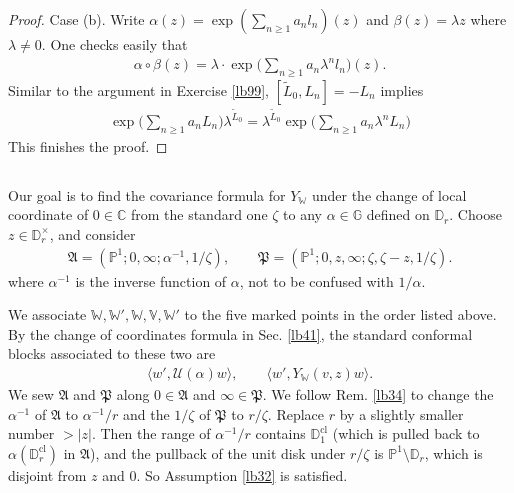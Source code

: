\documentclass[11pt,b5paper,notitlepage]{article}
\theoremstyle{definition}
\theoremstyle{plain}
\newcommand{\fk}{\mathfrak}
\newcommand{\mc}{\mathcal}
\newcommand{\wtd}{\widetilde}
\newcommand{\bk}[1]{\langle {#1}\rangle}
\newcommand{\Vbb}{\mathbb V}
\newcommand{\Wbb}{\mathbb W}
\newcommand{\Gbb}{\mathbb G}
\newcommand{\Cbb}{\mathbb C}
\newcommand{\Pbb}{\mathbb P}
\newcommand{\Dbb}{\mathbb D}
\newcommand{\cl}{\mathrm{cl}}
\numberwithin{equation}{section}
\begin{document}
\begin{proof}
Case (b). Write $\alpha(z)=\exp(\sum_{n\geq 1} a_nl_n)(z)$ and $\beta(z)=\lambda z$ where $\lambda\neq0$. One checks easily that
\begin{align*}
\alpha\circ\beta(z)=\lambda\cdot \exp\Big(\sum_{n\geq 1}a_n\lambda^nl_n\Big)(z).	
\end{align*}
Similar to the argument in Exercise \ref{lb99},  $[\wtd L_0,L_n]=-L_n$ implies
\begin{align*}
\exp\Big(\sum_{n\geq 1} a_nL_n\Big)\lambda^{\wtd L_0}=\lambda^{\wtd L_0}\exp\Big(\sum_{n\geq 1} a_n\lambda^nL_n\Big)	
\end{align*}
This finishes the proof.
\end{proof}







\subsection{}

Our goal is to find the covariance formula for $Y_\Wbb$ under the change of local coordinate of $0\in\Cbb$ from the standard one $\zeta$ to any $\alpha\in\Gbb$ defined on $\Dbb_r$. Choose $z\in\Dbb_r^\times$, and consider
\begin{align}
\fk A=(\Pbb^1;0,\infty;\alpha^{-1},1/\zeta),\qquad \fk P=(\Pbb^1;0,z,\infty;\zeta,\zeta-z,1/\zeta).	
\end{align}
where $\alpha^{-1}$ is the inverse function of $\alpha$, not to be confused with $1/\alpha$.

We associate $\Wbb,\Wbb',\Wbb,\Vbb,\Wbb'$ to the five marked points in the order listed above. By the change of coordinates formula in Sec. \ref{lb41}, the standard conformal blocks associated to these two are
\begin{align}
\bk{w',\mc U(\alpha)w},\qquad \bk{w',Y_\Wbb(v,z)w}.	\label{eq155}
\end{align}
We sew $\fk A$ and $\fk P$ along $0\in\fk A$ and $\infty\in\fk P$. We follow Rem. \ref{lb34} to change the $\alpha^{-1}$ of $\fk A$ to $\alpha^{-1}/r$ and the $1/\zeta$ of $\fk P$ to $r/\zeta$. Replace $r$ by a slightly smaller number $>|z|$. Then the range of $\alpha^{-1}/r$ contains $\Dbb_1^\cl$ (which is pulled back to $\alpha(\Dbb_r^\cl)$ in $\fk A$), and the pullback of the unit  disk under $r/\zeta$ is $\Pbb^1\setminus\Dbb_r$, which is disjoint from $z$ and $0$. So Assumption \ref{lb32} is satisfied.
\end{document}
